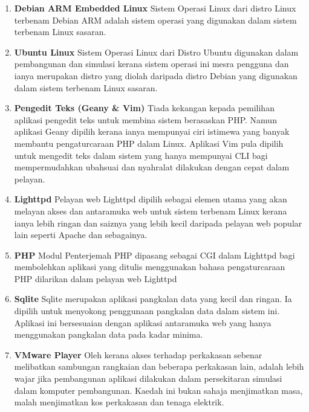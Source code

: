 \begin{enumerate}
\item \textbf{Debian ARM Embedded Linux} \newline
Sistem Operasi Linux dari distro Linux terbenam Debian ARM adalah sistem operasi yang digunakan dalam sistem terbenam Linux sasaran. 

\item \textbf{Ubuntu Linux} \newline
Sistem Operasi Linux dari Distro Ubuntu digunakan dalam pembangunan dan simulasi kerana sistem operasi ini mesra pengguna dan ianya merupakan distro yang diolah daripada distro Debian yang digunakan dalam sistem terbenam Linux sasaran.

\item \textbf{Pengedit Teks (Geany \& Vim)}
Tiada kekangan kepada pemilihan aplikasi pengedit teks untuk membina sistem berasaskan PHP. Namun aplikasi Geany dipilih kerana ianya mempunyai ciri istimewa yang banyak membantu pengaturcaraan PHP dalam Linux. Aplikasi Vim pula dipilih untuk mengedit teks dalam sistem yang hanya mempunyai \ac{CLI} bagi mempermudahkan ubahsuai dan nyahralat dilakukan dengan cepat dalam pelayan.

\item \textbf{Lighttpd}
Pelayan web Lighttpd dipilih sebagai elemen utama yang akan melayan akses dan antaramuka web untuk sistem terbenam Linux kerana ianya lebih ringan dan saiznya yang lebih kecil daripada pelayan web popular lain seperti Apache dan sebagainya.

\item \textbf{PHP}
Modul Penterjemah PHP dipasang sebagai CGI dalam Lighttpd bagi membolehkan aplikasi yang ditulis menggunakan bahasa pengaturcaraan PHP dilarikan dalam pelayan web Lighttpd

\item \textbf{Sqlite}
Sqlite merupakan aplikasi pangkalan data yang kecil dan ringan. Ia dipilih untuk menyokong penggunaan pangkalan data dalam sistem ini. Aplikasi ini bersesuaian dengan aplikasi antaramuka web yang hanya menggunakan pangkalan data pada kadar minima.

\item \textbf{VMware Player}
Oleh kerana akses terhadap perkakasan sebenar melibatkan sambungan rangkaian dan beberapa perkakasan lain, adalah lebih wajar jika pembangunan aplikasi dilakukan dalam persekitaran simulasi dalam komputer pembangunan. Kaedah ini bukan sahaja menjimatkan masa, malah menjimatkan kos perkakasan dan tenaga elektrik.

\end{enumerate}


